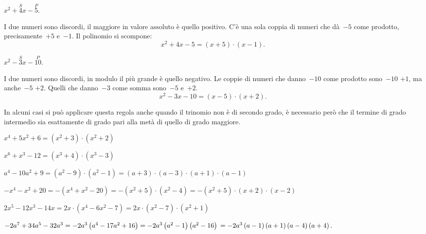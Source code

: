 \begin{esempio}
 \(x^{2}+\overset{S}{4}x-\overset{P}{5}.\)

I due numeri sono discordi, il maggiore in valore assoluto è quello
positivo. C'è una sola coppia di numeri che dà~\(-5\)
come prodotto, precisamente~\(+5\) e~\(-1\). Il polinomio si scompone:
\[x^{2}+4x-5=\left(x+5\right)\cdot \left(x-1\right).\]
\end{esempio}

\begin{esempio}
 \(x^{2}-\overset{S}{3}x-\overset{P}{10}.\)

I due numeri sono discordi, in modulo il più grande è quello
negativo. Le coppie di numeri che danno~\(-10\) come prodotto sono~\(-10\) \(+1\),
ma anche~\(-5\) \(+2\). Quelli che danno~\(-3\) come somma sono~\(-5\) e~\(+2\).
\[x^{2}-3x-10=\left(x-5\right)\cdot \left(x+2\right).\]
\end{esempio}

\begin{esempio}
 In alcuni casi si può applicare questa regola anche quando il trinomio
non è di secondo grado, è necessario però che il termine di grado
intermedio sia esattamente di grado pari alla metà di quello di grado
maggiore.

\begin{itemize*}
\item \(x^{4}+5x^{2}+6=\left(x^{2}+3\right)\cdot \left(x^{2}+2\right)\)
\item \(x^{6}+x^{3}-12=\left(x^{3}+4\right)\cdot \left(x^{3}-3\right)\)
\item \(a^{4}-10a^{2}+9=\left(a^{2}-9\right)\cdot\left(a^{2}-1\right)=
       \left(a+3\right)\cdot \left(a-3\right)\cdot 
       \left(a+1\right)\cdot\left(a-1\right)\)
\item \(-x^{4}-x^{2}+20=-\left(x^{4}+x^{2}-20\right)=
       -\left(x^{2}+5\right)\cdot\left(x^{2}-4\right)=
       -\left(x^{2}+5\right)\cdot\left(x+2\right)\cdot \left(x-2\right)\)
\item \(2x^{5}-12x^{3}-14x=2x\cdot \left(x^{4}-6x^{2}-7\right)=2x\cdot%
\left(x^{2}-7\right)\cdot \left(x^{2}+1\right)\)
\item \(-2a^{7}+34a^{5}-32a^{3}=-2a^{3}\left(a^{4}-17a^{2}+16\right)
    =-2a^{3}\left(a^{2}-1\right)\left(a^{2}-16\right)\\
    =-2a^{3}\left(a-1\right)\left(a+1\right)\left(a-4\right)\left(a+4\right).\)
\end{itemize*}
\end{esempio}

